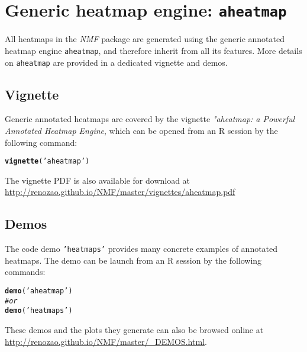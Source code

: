 \documentclass[a4paper]{article}\usepackage[]{graphicx}\usepackage[]{color}
\makeatletter
\newcommand{\hlstr}[1]{\textcolor[rgb]{0.192,0.494,0.8}{#1}}%
\newcommand{\hlcom}[1]{\textcolor[rgb]{0.678,0.584,0.686}{\textit{#1}}}%
\newcommand{\hlstd}[1]{\textcolor[rgb]{0.345,0.345,0.345}{#1}}%
\newcommand{\hlkwd}[1]{\textcolor[rgb]{0.737,0.353,0.396}{\textbf{#1}}}%
\newenvironment{kframe}{%
 \def\at@end@of@kframe{}%
 \ifinner\ifhmode%
  \def\at@end@of@kframe{\end{minipage}}%
  \begin{minipage}{\columnwidth}%
 \fi\fi%
 \def\FrameCommand##1{\hskip\@totalleftmargin \hskip-\fboxsep
 \colorbox{shadecolor}{##1}\hskip-\fboxsep
     \hskip-\linewidth \hskip-\@totalleftmargin \hskip\columnwidth}%
 \MakeFramed {\advance\hsize-\width
   \@totalleftmargin\z@ \linewidth\hsize
   \@setminipage}}%
 {\par\unskip\endMakeFramed%
 \at@end@of@kframe}
\newenvironment{knitrout}{}{} %
\let\code=\texttt
\newcommand{\pkgname}[1]{\textit{#1}\xspace}
\newcommand{\nmfpack}{\pkgname{NMF}}
\makeatother
\begin{document}
\section{Generic heatmap engine: \texttt{aheatmap}}
\label{sec:aheatmap}

All heatmaps in the \nmfpack package are generated using the generic
annotated heatmap engine \code{aheatmap}, and therefore inherit from all its
features. 
More details on \code{aheatmap} are provided in a dedicated vignette and demos.

\subsection{Vignette}

Generic annotated heatmaps are covered by the vignette \emph{"aheatmap: a
Powerful Annotated Heatmap Engine}, which can be opened from an R session by
the following command:
\begin{knitrout}
\color{fgcolor}\begin{kframe}
\begin{alltt}
\hlkwd{vignette}\hlstd{(}\hlstr{'aheatmap'}\hlstd{)}
\end{alltt}
\end{kframe}
\end{knitrout}

The vignette PDF is also available for download at
\url{http://renozao.github.io/NMF/master/vignettes/aheatmap.pdf}

\subsection{Demos}
The code demo \code{'heatmaps'} provides many concrete examples of annotated
heatmaps. 
The demo can be launch from an R session by the following commands:
\begin{knitrout}
\color{fgcolor}\begin{kframe}
\begin{alltt}
\hlkwd{demo}\hlstd{(}\hlstr{'aheatmap'}\hlstd{)}
\hlcom{# or }
\hlkwd{demo}\hlstd{(}\hlstr{'heatmaps'}\hlstd{)}
\end{alltt}
\end{kframe}
\end{knitrout}

These demos and the plots they generate can also be browsed online at
\url{http://renozao.github.io/NMF/master/_DEMOS.html}.
\end{document}

